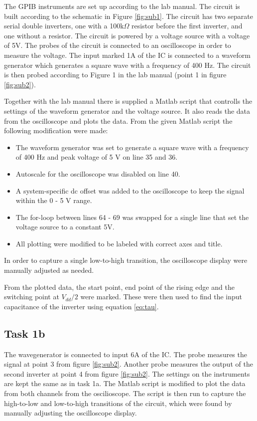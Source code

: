 \documentclass[onecolumn]{article}
\begin{document}
The GPIB instruments are set up according to the lab manual.
The circuit is built according to the schematic in Figure \ref{fig:sub1}. The circuit has two separate serial double inverters, one with a 100k$\Omega$ resistor before the first inverter, and one without a resistor. The circuit is powered by a voltage source with a voltage of 5V. The probes of the circuit is connected to an oscilloscope in order to measure the voltage. The input marked 1A of the IC is connected to a waveform generator which generates a square wave with a frequency of 400 Hz. The circuit is then probed according to Figure 1 in the lab manual (point 1 in figure \ref{fig:sub2}).

Together with the lab manual there is supplied a Matlab script that controlls the settings of the waveform generator and the voltage source. It also reads the data from the oscilloscope and plots the data. From the given Matlab script the following modification were made:
\begin{itemize}
  \item The waveform generator was set to generate a square wave with a frequency of 400 Hz and peak voltage of 5 V on line 35 and 36.
  \item Autoscale for the oscilloscope was disabled on line 40.
  \item A system-specific dc offset was added to the oscilloscope to keep the signal within the 0 - 5 V range.
  \item The for-loop between lines 64 - 69 was swapped for a single line that set the voltage source to a constant 5V.
  \item All plotting were modified to be labeled with correct axes and title.
\end{itemize}

In order to capture a single low-to-high transition, the oscilloscope display were manually adjusted as needed.

From the plotted data, the start point, end point of the rising edge and the switching point at $V_{dd}/2$ were marked. These were then used to find the input capacitance of the inverter using equation \ref{eq:tau}.

\subsection{Task 1b}
The wavegenerator is connected to input 6A of the IC. The probe measures the signal at point 3 from figure \ref{fig:sub2}. Another probe measures the output of the second inverter at point 4 from figure \ref{fig:sub2}. The settings on the instruments are kept the same as in task 1a. The Matlab script is modified to plot the data from both channels from the oscilioscope. The script is then run to capture the high-to-low and low-to-high transitions of the circuit, which were found by manually adjusting the oscilloscope display.
\end{document}
